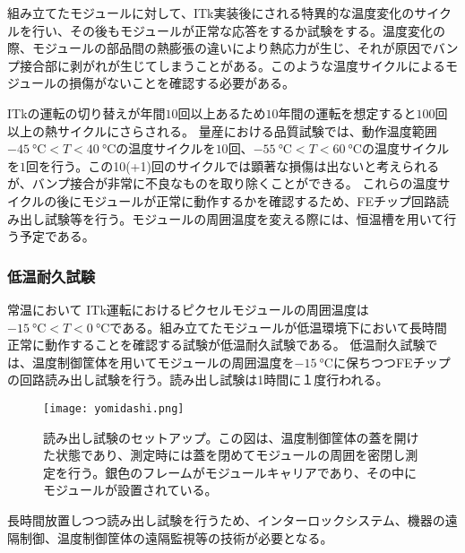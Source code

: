 組み立てたモジュールに対して、ITk実装後にされる特異的な温度変化のサイクルを行い、その後もモジュールが正常な応答をするか試験をする。温度変化の際、モジュールの部品間の熱膨張の違いにより熱応力が生じ、それが原因でバンプ接合部に剥がれが生じてしまうことがある。このような温度サイクルによるモジュールの損傷がないことを確認する必要がある。

ITkの運転の切り替えが年間$10$回以上あるため$10$年間の運転を想定すると$100$回以上の熱サイクルにさらされる。
量産における品質試験では、動作温度範囲$-45\ \si{\degreeCelsius}<T<40\ \si{\degreeCelsius}$の温度サイクルを$10$回、$-55\ \si{\degreeCelsius}<T<60\ \si{\degreeCelsius}$の温度サイクルを$1$回を行う。この10(+1)回のサイクルでは顕著な損傷は出ないと考えられるが、バンプ接合が非常に不良なものを取り除くことができる。
これらの温度サイクルの後にモジュールが正常に動作するかを確認するため、FEチップ回路読み出し試験等を行う。モジュールの周囲温度を変える際には、恒温槽を用いて行う予定である。

\subsubsection*{低温耐久試験}

常温において
ITk運転におけるピクセルモジュールの周囲温度は$-15\ \si{\degreeCelsius}<T<0\ \si{\degreeCelsius}$である。組み立てたモジュールが低温環境下において長時間正常に動作することを確認する試験が低温耐久試験である。
低温耐久試験では、温度制御筐体を用いてモジュールの周囲温度を$-15\ \si{\degreeCelsius}$に保ちつつFEチップの回路読み出し試験を行う。読み出し試験は1時間に１度行われる。
\begin{figure}[tbp]
  \centering
  \texttt{[image: yomidashi.png]}
  \caption[読み出し試験のセットアップ]{読み出し試験のセットアップ。この図は、温度制御筐体の蓋を開けた状態であり、測定時には蓋を閉めてモジュールの周囲を密閉し測定を行う。銀色のフレームがモジュールキャリアであり、その中にモジュールが設置されている。}
  \label{fig:yomidashi}
\end{figure}

長時間放置しつつ読み出し試験を行うため、インターロックシステム、機器の遠隔制御、温度制御筐体の遠隔監視等の技術が必要となる。

